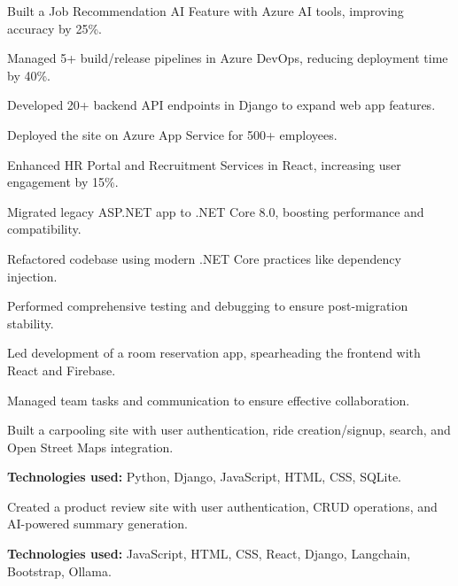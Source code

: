 \documentclass{resume}
\begin{document}
\begin{resume}
	\begin{experiences}
		{
			\item Built a Job Recommendation AI Feature with Azure AI tools, improving accuracy by 25\%.
			\item Managed 5+ build/release pipelines in Azure DevOps, reducing deployment time by 40\%.
			\item Developed 20+ backend API endpoints in Django to expand web app features.
			\item Deployed the site on Azure App Service for 500+ employees.
			\item Enhanced HR Portal and Recruitment Services in React, increasing user engagement by 15\%.
		}
		{
			\item Migrated legacy ASP.NET app to .NET Core 8.0, boosting performance and compatibility.
			\item Refactored codebase using modern .NET Core practices like dependency injection.
			\item Performed comprehensive testing and debugging to ensure post-migration stability.
		}
		{
			\item Led development of a room reservation app, spearheading the frontend with React and Firebase.
			\item Managed team tasks and communication to ensure effective collaboration.
		}
	\end{experiences}

	\begin{projects}
		{
			\item Built a carpooling site with user authentication, ride creation/signup, search, and Open Street Maps integration.
			\item \textbf{Technologies used:} Python, Django, JavaScript, HTML, CSS, SQLite.
		}
		{
			\item Created a product review site with user authentication, CRUD operations, and AI-powered summary generation.
			\item \textbf{Technologies used:} JavaScript, HTML, CSS, React, Django, Langchain, Bootstrap, Ollama.
		}
	\end{projects}

\end{resume}
\end{document}
